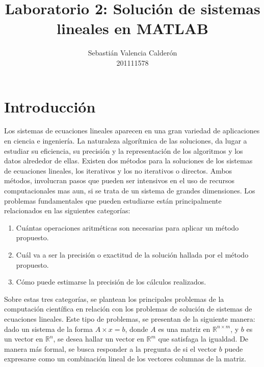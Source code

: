\documentclass[11pt, spanish]{article}
\date{}
\begin{document}
\author{Sebastián Valencia Calderón \\ 201111578}
\title{Laboratorio 2: Solución de sistemas lineales en \textsc{MATLAB}}
\maketitle


\section{Introducción}

Los sistemas de ecuaciones lineales aparecen en una gran variedad de aplicaciones en ciencia e ingeniería. La naturaleza algorítmica de las soluciones, da lugar a estudiar su eficiencia, su precisión y la representación de los algoritmos y los datos alrededor de ellas. Existen dos métodos para la soluciones de los sistemas de ecuaciones lineales, los iterativos y los no iterativos o directos. Ambos métodos, involucran pasos que pueden ser intensivos en el uso de recursos computacionales mas aun, si se trata de un sistema de grandes dimensiones. Los problemas fundamentales que pueden estudiarse están principalmente relacionados en las siguientes categorías:

\begin{enumerate}
\item Cuántas operaciones aritméticas son necesarias para aplicar un método propuesto.
\item Cuál va a ser la precisión o exactitud de la solución hallada por el método propuesto.
\item Cómo puede estimarse la precisión de los cálculos realizados.
\end{enumerate}

Sobre estas tres categorías, se plantean los principales problemas de la computación científica en relación con los problemas de solución de sistemas de ecuaciones lineales. Este tipo de problemas, se presentan de la siguiente manera: dado un sistema de la forma $A \times x = b$, donde $A$ es una matriz en $\mathbb{R}^{n \times m}$, y $b$ es un vector en $\mathbb{R}^{n}$, se desea hallar un vector en $\mathbb{R}^m$ que satisfaga la igualdad. De manera más formal, se busca responder a la pregunta de si el vector $b$ puede expresarse como un combinación lineal de los vectores columnas de la matriz.\\
\end{document}
